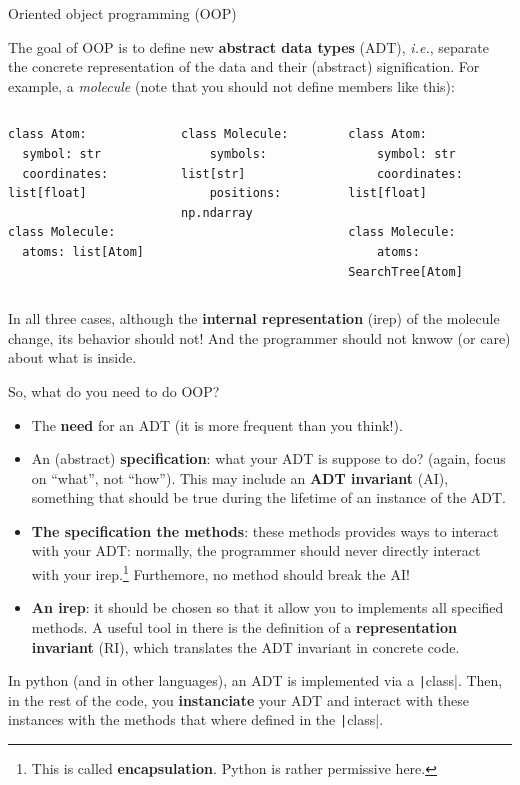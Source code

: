 \documentclass[10pt,
aspectratio=169
]{beamer}
\begin{document}
 \begin{frame}[fragile]{Oriented object programming (OOP)}
 	
 	The goal of OOP is to define new \textbf{abstract data types} (ADT), \textit{i.e.}, separate the concrete representation of the data and their (abstract) signification. For example, a \textit{molecule} (note that you should not define members like this):\begin{columns}
 		\begin{verbatim}
class Atom:
  symbol: str
  coordinates: list[float]
 	
class Molecule:
  atoms: list[Atom]
 		\end{verbatim}
 		\begin{verbatim}
class Molecule:
	symbols: list[str]
	positions: np.ndarray
 		\end{verbatim}
\begin{verbatim}
class Atom:
	symbol: str
	coordinates: list[float]

class Molecule:
	atoms: SearchTree[Atom]
\end{verbatim}
 	\end{columns}
In all three cases, although the \textbf{internal representation} (irep) of the molecule change, its behavior should not! And the programmer should not knwow  (or care) about what is inside.
 \end{frame}
 
\begin{frame}
	So, what do you need to do OOP?\begin{itemize}
		\item The \textbf{need} for an ADT (it is more frequent than you think!).
		\item An (abstract) \textbf{specification}: what your ADT is suppose to do? (again, focus on ``what'', not ``how''). This may include an \textbf{ADT invariant} (AI), something that should be true during the lifetime of an instance of the ADT.
		\item \textbf{The specification the methods}: these methods provides ways to interact with your ADT: normally, the programmer should never directly interact with your irep.\footnote{This is called \textbf{encapsulation}. Python is rather permissive here.} Furthemore,  no method should break the AI! 
		\item \textbf{An irep}: it should be chosen so that it allow you to  implements all specified methods. A useful tool in there is the definition of a \textbf{representation invariant} (RI), which translates the ADT invariant in concrete code. 
	\end{itemize}
	In python (and in other languages), an ADT is implemented via a \texttt|class|. Then, in the rest of the code, you \textbf{instanciate} your ADT and interact with these instances with the methods that where defined in the \texttt|class|.
	\vspace{1em}
\end{frame}
\end{document}
